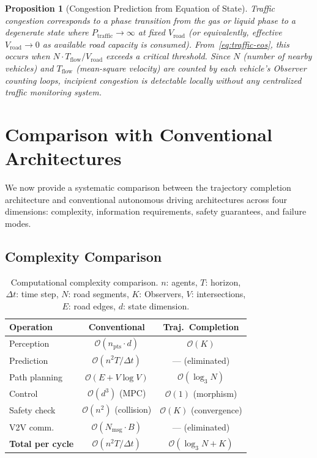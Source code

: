 \documentclass[twocolumn,10pt]{article}
\newtheorem{proposition}[theorem]{Proposition}
\theoremstyle{definition}
\newcommand{\BigO}{\mathcal{O}}
\begin{document}
\begin{proposition}[Congestion Prediction from Equation of State]
\label{prop:congestion}
Traffic congestion corresponds to a phase transition from the gas or liquid phase to a degenerate state where $P_{\mathrm{traffic}} \to \infty$ at fixed $V_{\mathrm{road}}$ (or equivalently, effective $V_{\mathrm{road}} \to 0$ as available road capacity is consumed). From~\eqref{eq:traffic-eos}, this occurs when $N \cdot T_{\mathrm{flow}} / V_{\mathrm{road}}$ exceeds a critical threshold. Since $N$ (number of nearby vehicles) and $T_{\mathrm{flow}}$ (mean-square velocity) are counted by each vehicle's Observer counting loops, incipient congestion is detectable locally without any centralized traffic monitoring system.
\end{proposition}


\section{Comparison with Conventional Architectures}
\label{sec:comparison}

We now provide a systematic comparison between the trajectory completion architecture and conventional autonomous driving architectures across four dimensions: complexity, information requirements, safety guarantees, and failure modes.

\subsection{Complexity Comparison}

\begin{table}[t]
\centering
\caption{Computational complexity comparison. $n$: agents, $T$: horizon, $\Delta t$: time step, $N$: road segments, $K$: Observers, $V$: intersections, $E$: road edges, $d$: state dimension.}
\label{tab:complexity}
\small
\begin{tabular}{@{}lcc@{}}
\toprule
\textbf{Operation} & \textbf{Conventional} & \textbf{Traj.\ Completion} \\
\midrule
Perception & $\BigO(n_{\mathrm{pts}} \cdot d)$ & $\BigO(K)$ \\
Prediction & $\BigO(n^2 T / \Delta t)$ & --- (eliminated) \\
Path planning & $\BigO(E + V \log V)$ & $\BigO(\log_3 N)$ \\
Control & $\BigO(d^3)$ (MPC) & $\BigO(1)$ (morphism) \\
Safety check & $\BigO(n^2)$ (collision) & $\BigO(K)$ (convergence) \\
V2V comm. & $\BigO(N_{\mathrm{msg}} \cdot B)$ & --- (eliminated) \\
\midrule
\textbf{Total per cycle} & $\BigO(n^2 T / \Delta t)$ & $\BigO(\log_3 N + K)$ \\
\bottomrule
\end{tabular}
\end{table}
\end{document}
